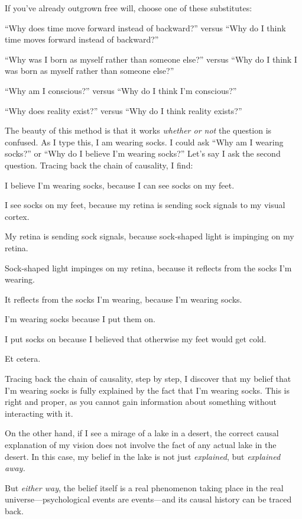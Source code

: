 {
 If you've already outgrown free will, choose one
of these substitutes:}

{
 ``Why does time move forward instead of
backward?'' versus ``Why do I think
time moves forward instead of backward?''}

{
 ``Why was I born as myself rather than someone
else?'' versus ``Why do I think I
was born as myself rather than someone else?''}

{
 ``Why am I conscious?'' versus
``Why do I think I'm
conscious?''}

{
 ``Why does reality exist?''
versus ``Why do I think reality
exists?''}

{
 The beauty of this method is that it works \textit{whether or not}
the question is confused. As I type this, I am wearing socks. I could
ask ``Why am I wearing socks?'' or
``Why do I believe I'm wearing
socks?'' Let's say I ask the second
question. Tracing back the chain of causality, I find:}

{
 I believe I'm wearing socks, because I can see
socks on my feet.}

{
 I see socks on my feet, because my retina is sending sock signals
to my visual cortex.}

{
 My retina is sending sock signals, because sock-shaped light is
impinging on my retina.}

{
 Sock-shaped light impinges on my retina, because it reflects from
the socks I'm wearing.}

{
 It reflects from the socks I'm wearing, because
I'm wearing socks.}

{
 I'm wearing socks because I put them on.}

{
 I put socks on because I believed that otherwise my feet would get
cold.}

{
 Et cetera.}

{
 Tracing back the chain of causality, step by step, I discover that
my belief that I'm wearing socks is fully explained by
the fact that I'm wearing socks. This is right and
proper, as you cannot gain information about something without
interacting with it.}

{
 On the other hand, if I see a mirage of a lake in a desert, the
correct causal explanation of my vision does not involve the fact of
any actual lake in the desert. In this case, my belief in the lake is
not just \textit{explained}, but \textit{explained away.}}

{
 But \textit{either way}, the belief itself is a real phenomenon
taking place in the real universe---psychological events are
events---and its causal history can be traced back.}

